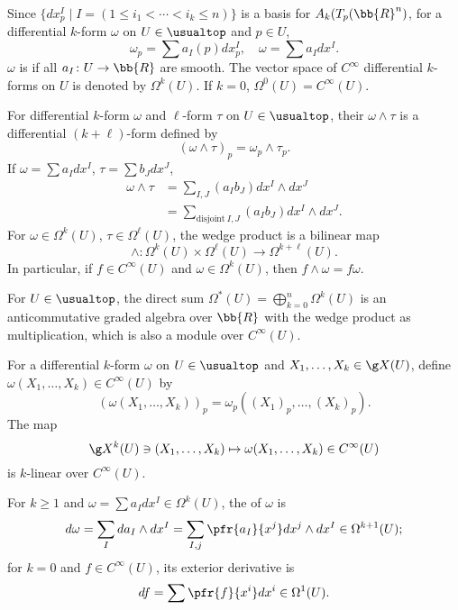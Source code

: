 Since $\{ dx^I_p \mid I = (1 \le i_1 < \dotsb < i_k \le n) \}$ is a basis for $A_k (T_p(\bb{R}^n)$, for a differential $k$-form $\omega$ on $U \in \usualtop$ and $p \in U$,
\[
\omega_p = \sum a_I (p) dx^I_p,\quad \omega = \sum a_I dx^I.
\]
$\omega$ is  if all $a_I \colon U \to \bb{R}$ are smooth. The vector space of $C^\infty$  differential $k$-forms on $U$ is denoted by $\Omega^k(U)$. If $k = 0$, $\Omega^0(U) = C^\infty(U)$.

For differential $k$-form $\omega$ and $\ell$-form $\tau$ on $U \in \usualtop$, their  $\omega \wedge \tau$ is a differential $(k+\ell)$-form defined by
\[
(\omega \wedge \tau)_p = \omega_p \wedge \tau_p.
\]
If $\omega = \sum a_I dx^I$, $\tau = \sum b_J dx^J$,
\begin{align*}
\omega \wedge \tau &= \sum_{I,J} (a_I b_J) dx^I \wedge dx^J \\
&= \sum_{\text{disjoint}\ I, J} (a_I b_J) dx^I \wedge dx^J.
\end{align*}
For $\omega \in \Omega^k (U)$, $\tau \in \Omega^\ell (U)$, the wedge product is a bilinear map
\[
\wedge \colon \Omega^k(U) \times \Omega^\ell(U) \to \Omega^{k+\ell}(U).
\]
In particular, if $f \in C^\infty (U)$ and $\omega \in \Omega^k(U)$, then $f \wedge \omega = f \omega$.

For $U \in \usualtop$, the direct sum $\Omega^* (U) = \bigoplus_{k = 0}^n \Omega^k(U)$ is an anticommutative graded algebra over $\bb{R}$ with the wedge product as multiplication, which is also a module over $C^\infty (U)$.


For a differential $k$-form $\omega$ on $U \in \usualtop$ and $X_1, \dotsc, X_k \in \g X(U)$, define $\omega (X_1, \dotsc, X_k) \in C^\infty(U)$ by
\[
(\omega (X_1, \dotsc, X_k))_p = \omega_p ((X_1)_p, \dotsc, (X_k)_p).
\]
The map
\[
\g X^k(U)  \ni (X_1, \dotsc, X_k) \mapsto \omega(X_1, \dotsc, X_k) \in C^\infty(U)
\]
is $k$-linear over $C^\infty(U)$.

For $k \ge 1$ and $\omega = \sum a_I dx^I \in \Omega^k(U)$, the  of $\omega$ is
\[
d\omega = \sum_I da_I \wedge dx^I = \sum_{I,j} \pfr{a_I}{x^j} dx^j \wedge dx^I \in \Omega^{k+1}(U);
\]
for $k = 0$ and $f \in C^\infty(U)$, its exterior derivative is
\[
df = \sum \pfr{f}{x^i} dx^i\in \Omega^1 (U).
\]

